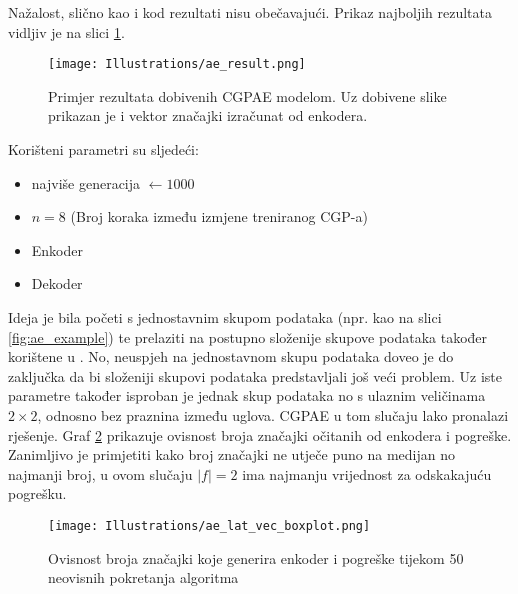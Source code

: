 Nažalost, slično kao i kod \cite{why_ae_diff} rezultati nisu obečavajući.
Prikaz najboljih rezultata vidljiv je na slici \ref{fig:ae_results}.

\begin{figure}[H]
	\centering
	\texttt{[image: Illustrations/ae\_result.png]}
	\caption{Primjer rezultata dobivenih CGPAE modelom. Uz dobivene slike prikazan je i vektor značajki izračunat od enkodera.}
	\label{fig:ae_results}
\end{figure}

Korišteni parametri su sljedeći:
\begin{itemize}
	\item {najviše generacija $\leftarrow 1000$}
	\item {$n = 8$ (Broj koraka između izmjene treniranog CGP-a)}
	\item {Enkoder}
	\item {Dekoder}
\end{itemize}
Ideja je bila početi s jednostavnim skupom podataka (npr. kao na slici \ref{fig:ae_example}) te prelaziti na postupno složenije skupove podataka također korištene u \cite{why_ae_diff}.
No, neuspjeh na jednostavnom skupu podataka doveo je do zaključka da bi složeniji skupovi podataka predstavljali još veći problem.
Uz iste parametre također isproban je jednak skup podataka no s ulaznim veličinama $2 \times 2$, odnosno bez praznina između uglova.
CGPAE u tom slučaju lako pronalazi rješenje.
Graf \ref{fig:ae_boxplot} prikazuje ovisnost broja značajki očitanih od enkodera i pogreške.
Zanimljivo je primjetiti kako broj značajki ne utječe puno na medijan no najmanji broj, u ovom slučaju $|f| = 2$ ima najmanju vrijednost za odskakajuću pogrešku.

\begin{figure}[H]
	\centering
	\texttt{[image: Illustrations/ae\_lat\_vec\_boxplot.png]}
	\caption{Ovisnost broja značajki koje generira enkoder i pogreške tijekom 50 neovisnih pokretanja algoritma}
	\label{fig:ae_boxplot}
\end{figure}
